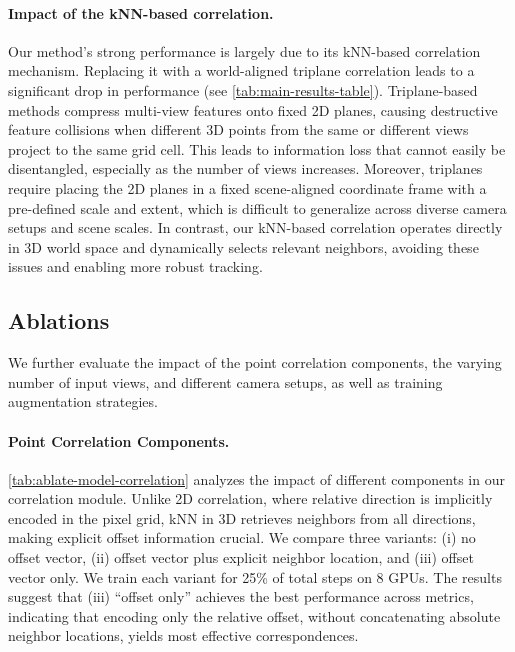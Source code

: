 \documentclass[10pt,twocolumn,letterpaper]{article}
\begin{document}
\paragraph{Impact of the kNN-based correlation.}
Our method’s strong performance is largely due to its kNN-based correlation mechanism. Replacing it with a world-aligned triplane correlation leads to a significant drop in performance (see \cref{tab:main-results-table}). Triplane-based methods compress multi-view features onto fixed 2D planes, causing destructive feature collisions when different 3D points from the same or different views project to the same grid cell. This leads to information loss that cannot easily be disentangled, especially as the number of views increases. Moreover, triplanes require placing the 2D planes in a fixed scene-aligned coordinate frame with a pre-defined scale and extent, which is difficult to generalize across diverse camera setups and scene scales. In contrast, our kNN-based correlation operates directly in 3D world space and dynamically selects relevant neighbors, avoiding these issues and enabling more robust tracking.

\subsection{Ablations} \label{sec:ablations} 
We further evaluate the impact of the point correlation components, the varying number of input views, and different camera setups, as well as training augmentation strategies. 


\paragraph{Point Correlation Components.}
\cref{tab:ablate-model-correlation} analyzes the impact of different components in our correlation module. Unlike 2D correlation, where relative direction is implicitly encoded in the pixel grid, kNN in 3D retrieves neighbors from all directions, making explicit offset information crucial. We compare three variants: (i) no offset vector, (ii) offset vector plus explicit neighbor location, and (iii) offset vector only. We train each variant for 25\% of total steps on 8 GPUs. The results suggest that (iii) “offset only” achieves the best performance across metrics, indicating that encoding only the relative offset, without concatenating absolute neighbor locations, yields most effective correspondences.


\end{document}
